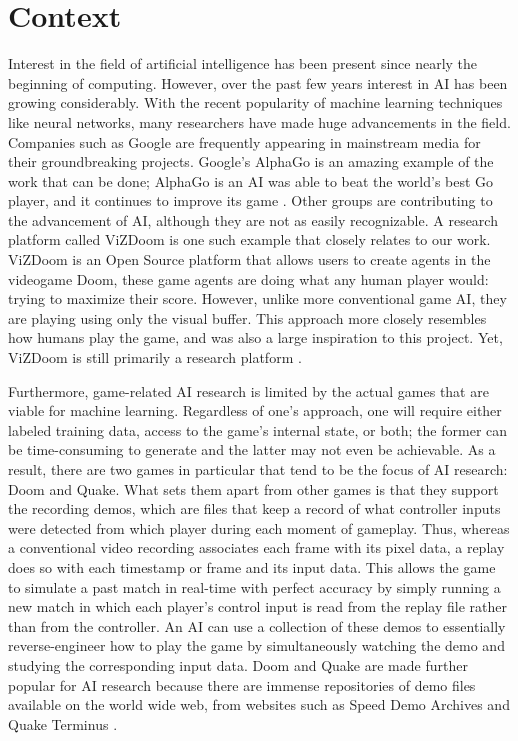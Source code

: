 


\section{Context}

Interest in the field of artificial intelligence has been present since nearly the beginning of computing. However, over the past few years interest in AI has been growing considerably. With the recent popularity of machine learning techniques like neural networks, many researchers have made huge advancements in the field. Companies such as Google are frequently appearing in mainstream media for their groundbreaking projects. Google's AlphaGo is an amazing example of the work that can be done; AlphaGo is an AI was able to beat the world's best Go player, and it continues to improve its game \cite{AlphaGo}. Other groups are contributing to the advancement of AI, although they are not as easily recognizable. A research platform called ViZDoom is one such example that closely relates to our work. ViZDoom is an Open Source platform that allows users to create agents in the videogame Doom, these game agents are doing what any human player would: trying to maximize their score. However, unlike more conventional game AI, they are playing using only the visual buffer. This approach more closely resembles how humans play the game, and was also a large inspiration to this project. Yet, ViZDoom is still primarily a research platform \cite{Kempka:2016}.

Furthermore, game-related AI research is limited by the actual games that are viable for machine learning. Regardless of one's approach, one will require either labeled training data, access to the game's internal state, or both; the former can be time-consuming to generate and the latter may not even be achievable. As a result, there are two games in particular that tend to be the focus of AI research: Doom and Quake. What sets them apart from other games is that they support the recording demos, which are files that keep a record of what controller inputs were detected from which player during each moment of gameplay. Thus, whereas a conventional video recording associates each frame with its pixel data, a replay does so with each timestamp or frame and its input data. This allows the game to simulate a past match in real-time with perfect accuracy by simply running a new match in which each player's control input is read from the replay file rather than from the controller. An AI can use a collection of these demos to essentially reverse-engineer how to play the game by simultaneously watching the demo and studying the corresponding input data. Doom and Quake are made further popular for AI research because there are immense repositories of demo files available on the world wide web, from websites such as Speed Demo Archives and Quake Terminus \cite{Thurau:2004}.

